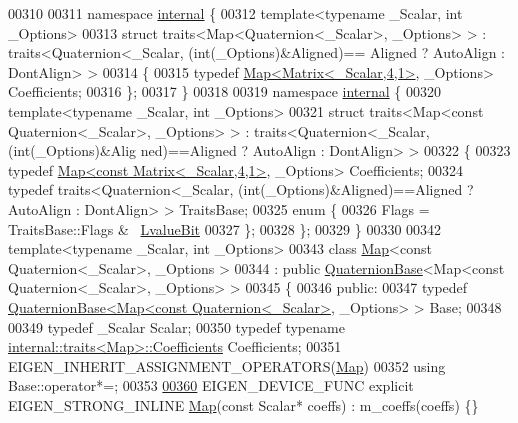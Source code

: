 \begin{DoxyCode}
00310 
00311 \textcolor{keyword}{namespace }\hyperlink{namespaceinternal}{internal} \{
00312   \textcolor{keyword}{template}<\textcolor{keyword}{typename} \_Scalar, \textcolor{keywordtype}{int} \_Options>
00313   \textcolor{keyword}{struct }traits<Map<Quaternion<\_Scalar>, \_Options> > : traits<Quaternion<\_Scalar, (int(\_Options)&Aligned)==
      Aligned ? AutoAlign : DontAlign> >
00314   \{
00315     \textcolor{keyword}{typedef} \hyperlink{group___core___module_class_eigen_1_1_map}{Map<Matrix<\_Scalar,4,1>}, \_Options> Coefficients;
00316   \};
00317 \}
00318 
00319 \textcolor{keyword}{namespace }\hyperlink{namespaceinternal}{internal} \{
00320   \textcolor{keyword}{template}<\textcolor{keyword}{typename} \_Scalar, \textcolor{keywordtype}{int} \_Options>
00321   \textcolor{keyword}{struct }traits<Map<const Quaternion<\_Scalar>, \_Options> > : traits<Quaternion<\_Scalar, (int(\_Options)&Alig
      ned)==Aligned ? AutoAlign : DontAlign> >
00322   \{
00323     \textcolor{keyword}{typedef} \hyperlink{group___core___module_class_eigen_1_1_map}{Map<const Matrix<\_Scalar,4,1>}, \_Options> Coefficients;
00324     \textcolor{keyword}{typedef} traits<Quaternion<\_Scalar, (int(\_Options)&Aligned)==Aligned ? AutoAlign : DontAlign> > 
      TraitsBase;
00325     \textcolor{keyword}{enum} \{
00326       Flags = TraitsBase::Flags & ~\hyperlink{group__flags_gae2c323957f20dfdc6cb8f44428eaec1a}{LvalueBit}
00327     \};
00328   \};
00329 \}
00330 
00342 \textcolor{keyword}{template}<\textcolor{keyword}{typename} \_Scalar, \textcolor{keywordtype}{int} \_Options>
00343 \textcolor{keyword}{class }\hyperlink{group___core___module_class_eigen_1_1_map}{Map}<const Quaternion<\_Scalar>, \_Options >
00344   : \textcolor{keyword}{public} \hyperlink{group___geometry___module_class_eigen_1_1_quaternion_base}{QuaternionBase}<Map<const Quaternion<\_Scalar>, \_Options> >
00345 \{
00346   \textcolor{keyword}{public}:
00347     \textcolor{keyword}{typedef} \hyperlink{group___geometry___module_class_eigen_1_1_quaternion_base}{QuaternionBase<Map<const Quaternion<\_Scalar>}, 
      \_Options> > Base;
00348 
00349     \textcolor{keyword}{typedef} \_Scalar Scalar;
00350     \textcolor{keyword}{typedef} \textcolor{keyword}{typename} \hyperlink{struct_eigen_1_1internal_1_1traits}{internal::traits<Map>::Coefficients} Coefficients;
00351     EIGEN\_INHERIT\_ASSIGNMENT\_OPERATORS(\hyperlink{group___core___module_class_eigen_1_1_map}{Map})
00352     \textcolor{keyword}{using} Base::operator*=;
00353 
\hyperlink{group___geometry___module_a8b321eb2bf9a4e4b76465564e80f212b}{00360}     EIGEN\_DEVICE\_FUNC \textcolor{keyword}{explicit} EIGEN\_STRONG\_INLINE \hyperlink{group___geometry___module_a8b321eb2bf9a4e4b76465564e80f212b}{Map}(\textcolor{keyword}{const} Scalar* coeffs) : m\_coeffs(coeffs) \{\}

\end{DoxyCode}
